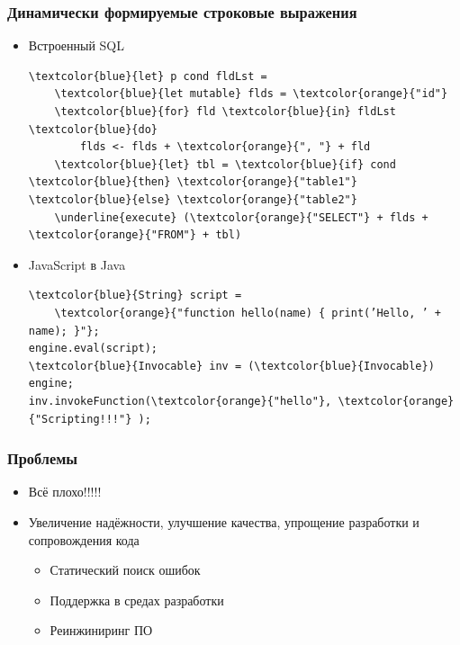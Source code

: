 \documentclass{beamer}
\begin{document}
\begin{frame}[fragile]
    \transwipe[direction=90]
    \frametitle{Динамически формируемые строковые выражения}
    \begin{itemize}
        \item Встроенный SQL
\begin{Verbatim}[commandchars=\\\{\}]
\textcolor{blue}{let} p cond fldLst =
    \textcolor{blue}{let mutable} flds = \textcolor{orange}{"id"}
    \textcolor{blue}{for} fld \textcolor{blue}{in} fldLst \textcolor{blue}{do}
        flds <- flds + \textcolor{orange}{", "} + fld 
    \textcolor{blue}{let} tbl = \textcolor{blue}{if} cond \textcolor{blue}{then} \textcolor{orange}{"table1"} \textcolor{blue}{else} \textcolor{orange}{"table2"}    
    \underline{execute} (\textcolor{orange}{"SELECT"} + flds + \textcolor{orange}{"FROM"} + tbl)
\end{Verbatim}
        \item JavaScript в Java
\begin{Verbatim}[commandchars=\\\{\}]
\textcolor{blue}{String} script =
    \textcolor{orange}{"function hello(name) { print(’Hello, ’ + name); }"};
engine.eval(script);
\textcolor{blue}{Invocable} inv = (\textcolor{blue}{Invocable}) engine;
inv.invokeFunction(\textcolor{orange}{"hello"}, \textcolor{orange}{"Scripting!!!"} );
\end{Verbatim}
    \end{itemize}

\end{frame}

\begin{frame}
    \transwipe[direction=90]
    \frametitle{Проблемы}
    \begin{itemize}
        \item Всё плохо!!!!!
        \item Увеличение надёжности, улучшение качества, упрощение разработки и сопровождения кода
        \begin{itemize}
            \item Статический поиск ошибок
            \item Поддержка в средах разработки
            \item Реинжиниринг ПО
        \end{itemize}
    \end{itemize}
\end{frame}
\end{document}
